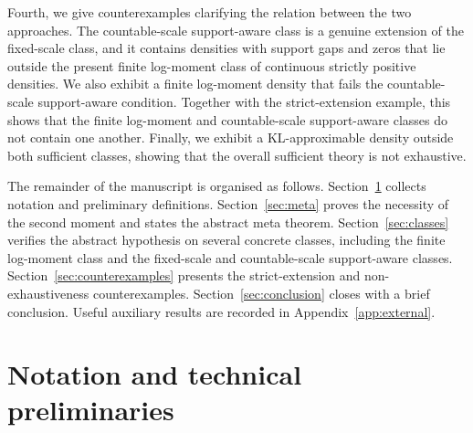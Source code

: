 \documentclass[11pt]{article}
\theoremstyle{definition}
\begin{document}
Fourth, we give counterexamples clarifying the relation between the two approaches. The countable-scale support-aware class is a genuine extension of the fixed-scale class, and it contains densities with support gaps and zeros that lie outside the present finite log-moment class of continuous strictly positive densities. We also exhibit a finite log-moment density that fails the countable-scale support-aware condition. Together with the strict-extension example, this shows that the finite log-moment and countable-scale support-aware classes do not contain one another. Finally, we exhibit a KL-approximable density outside both sufficient classes, showing that the overall sufficient theory is not exhaustive.

The remainder of the manuscript is organised as follows. Section~\ref{sec:notation} collects notation and preliminary definitions. Section~\ref{sec:meta} proves the necessity of the second moment and states the abstract meta theorem. Section~\ref{sec:classes} verifies the abstract hypothesis on several concrete classes, including the finite log-moment class and the fixed-scale and countable-scale support-aware classes. Section~\ref{sec:counterexamples} presents the strict-extension and non-exhaustiveness counterexamples. Section~\ref{sec:conclusion} closes with a brief conclusion. Useful auxiliary results are recorded in Appendix~\ref{app:external}.

\section{Notation and technical preliminaries}\label{sec:notation}
\end{document}
